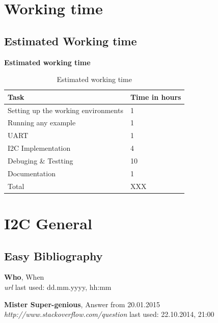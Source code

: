 \documentclass[12pt]{article}
\begin{document}
\section{Working time}
\subsection{Estimated Working time}
\begin{center}

\textbf{Estimated working time}
\end{center}
\begin{table}[h]
\begin{tabular}{|p{}|p{}|}
\hline
\textbf{Task}                                              & \textbf{Time in hours                              } \\ \hline \hline
Setting up the working environments &  1  \\ \hline 
Running any example &  1  \\ \hline 
UART &  1  \\ \hline 
I2C Implementation &  4  \\ \hline 
Debuging \& Testting &  10  \\ \hline 
Documentation &  1  \\ \hline 
\hline
Total &  XXX \\ \hline 
\end{tabular}
\caption{Estimated working time}
\end{table}


\section{I2C General}

\newpage
\listoftables
\listoffigures
\printglossaries
\subsection{Easy Bibliography}
\begin{thebibliography}{56}

   \textbf{Who}, When\\
  \textit{url}
  \newline last used: dd.mm.yyyy, hh:mm
 
  \textbf{Mister Super-genious}, Answer from 20.01.2015\\
  \textit{http://www.stackoverflow.com/question}
  \newline last used: 22.10.2014, 21:00
\end{thebibliography}
\end{document}
